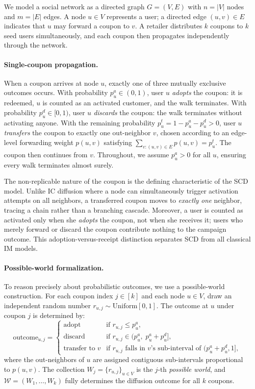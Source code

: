 \documentclass[sigconf]{acmart}
\begin{document}
We model a social network as a directed graph $G = (V, E)$ with
$n = |V|$ nodes and $m = |E|$ edges.
A node $u \in V$ represents a user; a directed edge $(u, v) \in E$
indicates that $u$ may forward a coupon to $v$.
A retailer distributes $k$ coupons to $k$ seed users simultaneously,
and each coupon then propagates independently through the network.

\paragraph{Single-coupon propagation.}
When a coupon arrives at node $u$, exactly one of three mutually
exclusive outcomes occurs.
With probability $p_u^a \in (0,1)$, user $u$ \emph{adopts} the coupon:
it is redeemed, $u$ is counted as an activated customer, and the walk
terminates.
With probability $p_u^d \in [0,1)$, user $u$ \emph{discards} the
coupon: the walk terminates without activating anyone.
With the remaining probability $p_u^t = 1 - p_u^a - p_u^d > 0$, user
$u$ \emph{transfers} the coupon to exactly one out-neighbor $v$,
chosen according to an edge-level forwarding weight $p(u,v)$ satisfying
$\sum_{v:(u,v)\in E} p(u,v) = p_u^t$.
The coupon then continues from $v$.
Throughout, we assume $p_u^a > 0$ for all $u$, ensuring every walk
terminates almost surely.

The non-replicable nature of the coupon is the defining characteristic
of the SCD model.
Unlike IC diffusion where a node can simultaneously trigger activation
attempts on all neighbors, a transferred coupon moves to \emph{exactly
one} neighbor, tracing a chain rather than a branching cascade.
Moreover, a user is counted as activated only when she \emph{adopts}
the coupon, not when she receives it; users who merely forward or
discard the coupon contribute nothing to the campaign outcome.
This adoption-versus-receipt distinction separates SCD from all
classical IM models.

\paragraph{Possible-world formalization.}
To reason precisely about probabilistic outcomes, we use a
possible-world construction.
For each coupon index $j \in [k]$ and each node $u \in V$, draw an
independent random number $r_{u,j} \sim \mathrm{Uniform}[0,1]$.
The outcome at $u$ under coupon $j$ is determined by:
\[
  \mathrm{outcome}_{u,j} =
  \begin{cases}
    \text{adopt}          & \text{if } r_{u,j} \leq p_u^a, \\
    \text{discard}        & \text{if } r_{u,j} \in (p_u^a,\; p_u^a+p_u^d], \\
    \text{transfer to }v  & \text{if } r_{u,j} \text{ falls in } v\text{'s
                            sub-interval of } (p_u^a{+}p_u^d, 1],
  \end{cases}
\]
where the out-neighbors of $u$ are assigned contiguous sub-intervals
proportional to $p(u,v)$.
The collection $W_j = \{r_{u,j}\}_{u\in V}$ is the $j$-th
\emph{possible world}, and $\mathcal{W} = (W_1, \ldots, W_k)$ fully
determines the diffusion outcome for all $k$ coupons.
\end{document}
